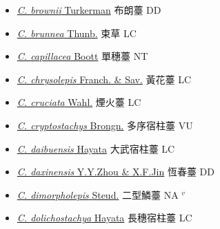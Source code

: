 \begin{itemize}
\begin{itemize}
        \item[] \href{http://www.theplantlist.org/tpl1.1/search?q=Carex+brownii}{\textit{C. brownii} Turkerman}   布朗薹 DD
        \item[] \href{http://www.theplantlist.org/tpl1.1/search?q=Carex+brunnea}{\textit{C. brunnea} Thunb.}   束草 LC
        \item[] \href{http://www.theplantlist.org/tpl1.1/search?q=Carex+capillacea}{\textit{C. capillacea} Boott}   單穗薹 NT
        \item[] \href{http://www.theplantlist.org/tpl1.1/search?q=Carex+chrysolepis}{\textit{C. chrysolepis} Franch. \& Sav.}   黃花薹 LC
        \item[] \href{http://www.theplantlist.org/tpl1.1/search?q=Carex+cruciata}{\textit{C. cruciata} Wahl.}   煙火薹 LC
        \item[] \href{http://www.theplantlist.org/tpl1.1/search?q=Carex+cryptostachys}{\textit{C. cryptostachys} Brongn.}   多序宿柱薹 VU
        \item[] \href{http://www.theplantlist.org/tpl1.1/search?q=Carex+daibuensis}{\textit{C. daibuensis} Hayata}     大武宿柱薹 LC
        \item[] \href{http://www.theplantlist.org/tpl1.1/search?q=Carex+daxinensis}{\textit{C. daxinensis} Y.Y.Zhou \& X.F.Jin}   恆春薹 DD
        \item[] \href{http://www.theplantlist.org/tpl1.1/search?q=Carex+dimorpholepis}{\textit{C. dimorpholepis} Steud.}   二型鱗薹 NA $^v$
        \item[] \href{http://www.theplantlist.org/tpl1.1/search?q=Carex+dolichostachya}{\textit{C. dolichostachya} Hayata}   長穗宿柱薹 LC

\end{itemize}
\end{itemize}
